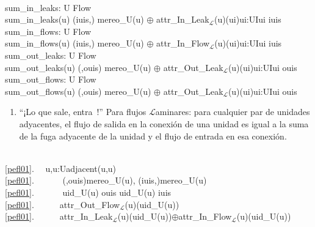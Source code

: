 \mnewfoil\LLLL

\bp
{}\\
\>sum\_in\_leaks: U {\RIGHTARROW} Flow\\
\>sum\_in\_leaks(u) {\IS}  (iuis,) {\EQ} mereo\_U(u)  $\oplus$ {\LBRACE}attr\_In\_Leak$_{\mathcal{L}}$(u)(ui){\BAR}ui:UI{\RDOT}ui {\ISIN} iuis{\RBRACE} \\
\>sum\_in\_flows: U {\RIGHTARROW} Flow\\
\>sum\_in\_flows(u) {\IS}  (iuis,) {\EQ} mereo\_U(u)  $\oplus$ {\LBRACE}attr\_In\_Flow$_{\mathcal{L}}$(u)(ui){\BAR}ui:UI{\RDOT}ui {\ISIN} iuis{\RBRACE} \\
\>sum\_out\_leaks: U {\RIGHTARROW} Flow\\
\>sum\_out\_leaks(u) {\IS}  (,ouis) {\EQ} mereo\_U(u)  $\oplus$ {\LBRACE}attr\_Out\_Leak$_{\mathcal{L}}$(u)(ui){\BAR}ui:UI{\RDOT}ui {\ISIN} ouis{\RBRACE} \\
\>sum\_out\_flows: U {\RIGHTARROW} Flow\\
\>sum\_out\_flows(u) {\IS}  (,ouis) {\EQ} mereo\_U(u)  $\oplus$ {\LBRACE}attr\_Out\_Leak$_{\mathcal{L}}$(u)(ui){\BAR}ui:UI{\RDOT}ui {\ISIN} ouis{\RBRACE} 
\ep

\mnewfoil

\begin{enumerate}\setei
\item \label{pefl01} ``¡Lo que sale, entra~!'' Para flujos $\mathcal{L}$aminares: para cualquier par de unidades adyacentes,
                     el flujo de salida en la conexión de una unidad es igual a
                     la suma de la fuga adyacente de la unidad y el flujo de entrada en esa conexión.
\savei\end{enumerate}

\bp
\>\ \\
\ref{pefl01}.\ \ {\ALL} u,u{\PRIM}:U{\RDOT}adjacent(u,u{\PRIM}) {\DBLRIGHTARROW}\\
\ref{pefl01}.\ \ \ \ \ \  (,ouis){\EQ}mereo\_U(u), (iuis{\PRIM},){\EQ}mereo\_U(u{\PRIM}) \\
\ref{pefl01}.\ \ \ \ \ \  uid\_U(u{\PRIM}) {\ISIN} ouis {\WEDGE} uid\_U(u) {\ISIN} iuis {\PRIM}\\
\ref{pefl01}.\ \ \ \ \ \ attr\_Out\_Flow$_{\mathcal{L}}$(u)(uid\_U(u{\PRIM})) {\EQ} \\
\ref{pefl01}.\ \ \ \ \ \ attr\_In\_Leak$_{\mathcal{L}}$(u)(uid\_U(u))$\oplus$attr\_In\_Flow$_{\mathcal{L}}$(u{\PRIM})(uid\_U(u)) 
\ep

